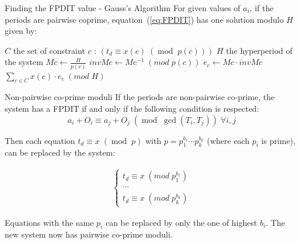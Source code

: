 \documentclass{beamer}
\begin{document}
    \begin{frame}{Finding the FPDIT value - Gauss's Algorithm}
        For given values of $a_i$, if the periods are pairwise coprime, equation~(\ref{eq:FPDIT}) has one solution modulo $H$ given by:

        \begin{algorithm}[H]
            \caption{Gauss's CRP Algorithm}
            \label{alg:algoCRP}
            \begin{algorithmic}[1]
                \REQUIRE $C$ the set of constraint $c$ : $\left( t_d \equiv x(c) \; (\operatorname{mod} \; p(c)) \right)$
                \REQUIRE $H$ the hyperperiod of the system
                    \STATE $Mc \leftarrow \frac{H}{p(c)}$
                    \STATE $invMc \leftarrow Mc^{-1} \; (mod \; p(c))$
                    \STATE $e_c \leftarrow Mc \cdot invMc$
                \ENDFOR
                \RETURN $\sum\limits_{c \in C}{x(c) \cdot e_c} \; (mod \; H)$
            \end{algorithmic}
        \end{algorithm}

    \end{frame}

    \begin{frame}{Non-pairwise co-prime moduli}
        If the periods are non-pairwise co-prime, the system has a FPDIT if and only if the following condition is respected:
        \[
            a_i + O_i \equiv a_j + O_j \; (\operatorname{mod} \; \operatorname{gcd}(T_i,
            T_j)) \; \forall i,j
        \]

        Then each equation $t_d \equiv x \; (\operatorname{mod} \; p)$ with $p = p_1^{b_1} \cdots p_k^{b_k}$ (where each $p_i$ is prime), can be replaced by the system:

       \[
            \begin{array}{l}
                \left\{
                    \begin{array}{l}
                         t_d \equiv x \; (mod \; p_1^{b_1}) \\
                         \cdots \\
                         t_d \equiv x \; (mod \; p_k^{b_k})
                    \end{array}
                \right.
            \end{array}
        \]

        Equations with the same $p_i$ can be replaced by only the one of highest $b_i$. The new system now has pairwise co-prime moduli.

    \end{frame}
\end{document}
